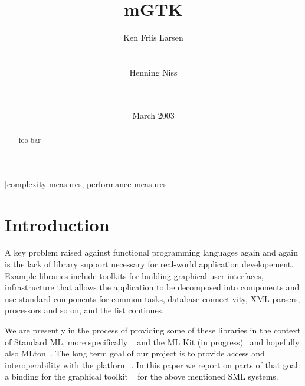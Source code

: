 \documentclass{sig-alternate}
\begin{document}
\title{mGTK}%
{}
\author{
  \alignauthor Ken Friis Larsen\\
     \\
     \\
  \alignauthor Henning Niss\\
     \\
     \\
}
\date{March 2003}
\maketitle

\begin{abstract}
foo bar
\end{abstract}

[complexity measures, performance measures]



\section{Introduction}

A key problem raised against functional programming languages again and
again is the lack of library support necessary for real-world application
developement. Example libraries include toolkits for building graphical
user interfaces, infrastructure that allows the application to be
decomposed into components and use standard components for common tasks,
database connectivity, XML parsers, processors and so on, and the
list continues.

We are presently in the process of providing some of these libraries
in the context of Standard ML, more specifically
\mosml~\cite{Mosml-webpage:2003} and the ML Kit (in
progress)~\cite{MLKit-webpage:2003} and hopefully also
MLton~\cite{MLton-webpage:2003}. The long term goal of our project is
to provide access and interoperability with the \GNOME
platform~\cite{GNOME-webpage:2003}. In this paper we report on parts
of that goal: a binding for the graphical toolkit
\Gtk~\cite{Gtk-webpage:2003} for the above mentioned SML systems.
\end{document}
